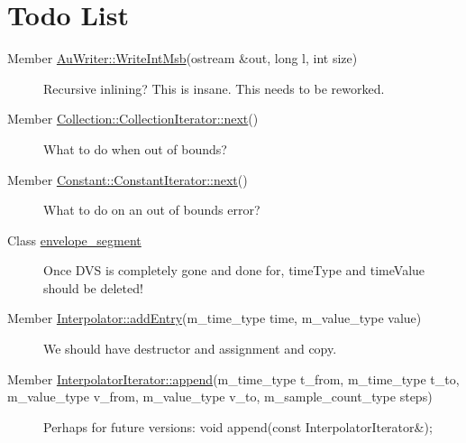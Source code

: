 \hypertarget{todo}{}\section{Todo List}\label{todo}
\label{_todo000003}
\hypertarget{todo__todo000003}{}
 \begin{description}
\item[Member \hyperlink{classAuWriter_h1}{Au\-Writer::Write\-Int\-Msb}(ostream \&out, long l, int size) ]Recursive inlining? This is insane. This needs to be reworked. \end{description}


\label{_todo000004}
\hypertarget{todo__todo000004}{}
 \begin{description}
\item[Member \hyperlink{classCollection_1_1CollectionIterator_a3}{Collection::Collection\-Iterator::next}() ]What to do when out of bounds? \end{description}


\label{_todo000005}
\hypertarget{todo__todo000005}{}
 \begin{description}
\item[Member \hyperlink{classConstant_1_1ConstantIterator_a3}{Constant::Constant\-Iterator::next}() ]What to do on an out of bounds error?\end{description}


\label{_todo000002}
\hypertarget{todo__todo000002}{}
 \begin{description}
\item[Class \hyperlink{structenvelope__segment}{envelope\_\-segment} ]Once DVS is completely gone and done for, time\-Type and time\-Value should be deleted! \end{description}


\label{_todo000006}
\hypertarget{todo__todo000006}{}
 \begin{description}
\item[Member \hyperlink{classInterpolator_a2}{Interpolator::add\-Entry}(m\_\-time\_\-type time, m\_\-value\_\-type value) ]We should have destructor and assignment and copy. \end{description}


\label{_todo000007}
\hypertarget{todo__todo000007}{}
 \begin{description}
\item[Member \hyperlink{classInterpolatorIterator_a1}{Interpolator\-Iterator::append}(m\_\-time\_\-type t\_\-from, m\_\-time\_\-type t\_\-to, m\_\-value\_\-type v\_\-from, m\_\-value\_\-type v\_\-to, m\_\-sample\_\-count\_\-type steps) ]Perhaps for future versions: void append(const Interpolator\-Iterator\&);\end{description}


